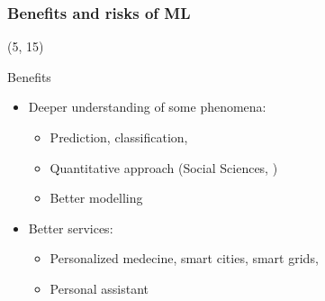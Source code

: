 \begin{frame}
  \frametitle{Benefits and risks of \ac{ML}}

  \begin{textblock}{45}(5, 15)
    \begin{block}{Benefits}
      \begin{itemize}
      \item Deeper understanding of some phenomena:
        \begin{itemize}
        \item Prediction, classification, \etc{}
        \item Quantitative approach (Social Sciences, \etc{})
        \item Better modelling
        \end{itemize}
      \item Better services:
        \begin{itemize}
        \item Personalized medecine, smart cities, smart grids, \etc{}
        \item Personal assistant
        \end{itemize}
      \end{itemize}
    \end{block}
  \end{textblock}


\end{frame}
